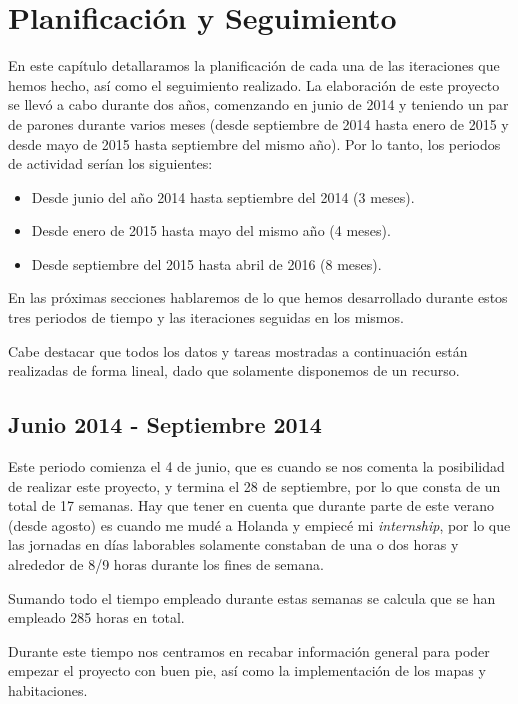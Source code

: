 \chapter{Planificación y Seguimiento}

En este capítulo detallaramos la planificación de cada una de las iteraciones que hemos hecho, así como el seguimiento realizado. La elaboración de este proyecto se llevó a cabo durante dos años, comenzando en junio de 2014 y teniendo un par de parones durante varios meses (desde septiembre de 2014 hasta enero de 2015 y desde mayo de 2015 hasta septiembre del mismo año). 
Por lo tanto, los periodos de actividad serían los siguientes:

\begin{itemize}
  \item Desde junio del año 2014 hasta septiembre del 2014 (3 meses).
  \item Desde enero de 2015 hasta mayo del mismo año (4 meses).
  \item Desde septiembre del 2015 hasta abril de 2016 (8 meses).
\end{itemize}

En las próximas secciones hablaremos de lo que hemos desarrollado durante estos tres periodos de tiempo y las iteraciones seguidas en los mismos.

Cabe destacar que todos los datos y tareas mostradas a continuación están realizadas de forma lineal, dado que solamente disponemos de un recurso.

\section{Junio 2014 - Septiembre 2014}

Este periodo comienza el 4 de junio, que es cuando se nos comenta la posibilidad de realizar este proyecto, y termina el 28 de septiembre, por lo que consta de un total de 17 semanas. Hay que tener en cuenta que durante parte de este verano (desde agosto) es cuando me mudé a Holanda y empiecé mi \textit{internship}, por lo que las jornadas en días laborables solamente constaban de una o dos horas y alrededor de 8/9 horas durante los fines de semana.

Sumando todo el tiempo empleado durante estas semanas se calcula que se han empleado 285 horas en total.

Durante este tiempo nos centramos en recabar información general para poder empezar el proyecto con buen pie, así como la implementación de los mapas y habitaciones.

